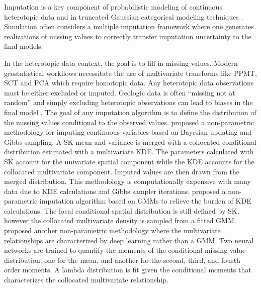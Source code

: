 Imputation is a key component of probabilistic modeling of continuous heterotopic data \citep{barnett2015multivariate,silva2018multivariate,hadavand2023spatial} and in truncated Gaussian categorical modeling techniques \citep{silva2018enhanced,arroyo2020iterative,madani2021enhanced,armstrong2011plurigaussian}. Simulation often considers a multiple imputation framework \citep{little2019statistical} where one generates realizations of missing values to correctly transfer imputation uncertainty to the final models.

In the heterotopic data context, the goal is to fill in missing values. Modern geostatistical workflows necessitate the use of multivariate transforms like \gls{PPMT}, \gls{SCT} and \gls{PCA} which require homotopic data. Any heterotopic data observations must be either excluded or imputed. Geologic data is often ``missing not at random'' and simply excluding heterotopic observations can lead to biases in the final model \citep{dasilva2019treatment}. The goal of any imputation algorithm is to define the distribution of the missing values conditional to the observed values. \cite{barnett2015multivariate} proposed a non-parametric methodology for imputing continuous variables based on Bayesian updating and Gibbs sampling.  A \gls{SK} mean and variance is merged with a collocated conditional distribution estimated with a multivariate \gls{KDE}. The parameters calculated with \gls{SK} account for the univariate spatial component while the \gls{KDE} accounts for the collocated multivariate component. Imputed values are then drawn from the merged distribution. This methodology is computationally expensive with many data due to \gls{KDE} calculations and Gibbs sampler iterations. \cite{silva2018multivariate} proposed a non-parametric imputation algorithm based on \glspl{GMM} to relieve the burden of \gls{KDE} calculations. The local conditional spatial distribution is still defined by \gls{SK}, however the collocated multivariate density is sampled from a fitted \gls{GMM}. \cite{hadavand2023spatial} proposed another non-parametric methodology where the multivariate relationships are characterized by deep learning rather than a \gls{GMM}. Two neural networks are trained to quantify the moments of the conditional missing value distribution; one for the mean, and another for the second, third, and fourth order moments. A lambda distribution is fit given the conditional moments that characterizes the collocated multivariate relationship.

